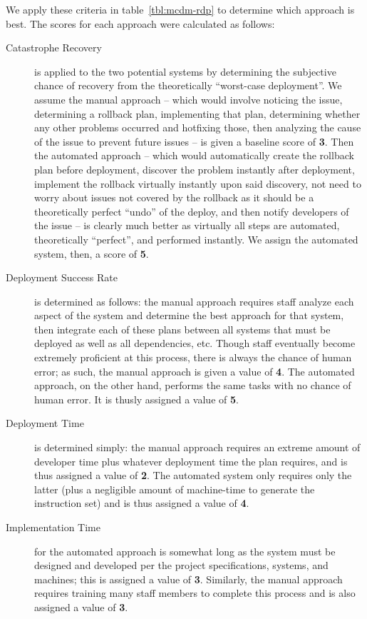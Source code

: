 \documentclass[12pt]{article}
\begin{document}
We apply these criteria in table~\ref{tbl:mcdm-rdp} to determine which approach is best. The scores for each approach were calculated as follows:
\begin{description}
\item[Catastrophe Recovery] is applied to the two potential systems by determining the subjective chance of recovery from the theoretically ``worst-case deployment''. We assume the manual approach -- which would involve noticing the issue, determining a rollback plan, implementing that plan, determining whether any other problems occurred and hotfixing those, then analyzing the cause of the issue to prevent future issues -- is given a baseline score of {\bf 3}. Then the automated approach -- which would automatically create the rollback plan before deployment, discover the problem instantly after deployment, implement the rollback virtually instantly upon said discovery, not need to worry about issues not covered by the rollback as it should be a theoretically perfect ``undo'' of the deploy, and then notify developers of the issue -- is clearly much better as virtually all steps are automated, theoretically ``perfect'', and performed instantly. We assign the automated system, then, a score of {\bf 5}.
\item[Deployment Success Rate] is determined as follows: the manual approach requires staff analyze each aspect of the system and determine the best approach for that system, then integrate each of these plans between all systems that must be deployed as well as all dependencies, etc. Though staff eventually become extremely proficient at this process, there is always the chance of human error; as such, the manual approach is given a value of {\bf 4}. The automated approach, on the other hand, performs the same tasks with no chance of human error. It is thusly assigned a value of {\bf 5}.
\item[Deployment Time] is determined simply: the manual approach requires an extreme amount of developer time plus whatever deployment time the plan requires, and is thus assigned a value of {\bf 2}. The automated system only requires only the latter (plus a negligible amount of machine-time to generate the instruction set) and is thus assigned a value of {\bf 4}.
\item[Implementation Time] for the automated approach is somewhat long as the system must be designed and developed per the project specifications, systems, and machines; this is assigned a value of {\bf 3}. Similarly, the manual approach requires training many staff members to complete this process and is also assigned a value of {\bf 3}.

\end{description}
\end{document}
